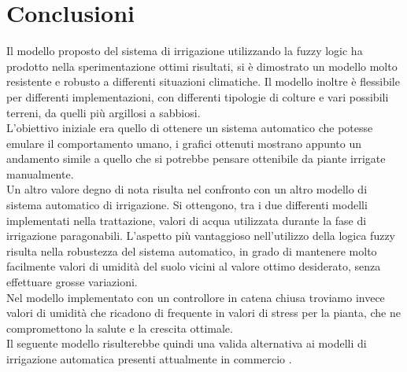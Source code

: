 \documentclass[conference,10pt]{IEEEtran}
\begin{document}
\section{Conclusioni}\label{sec:conclusion}
Il modello proposto del sistema di irrigazione utilizzando la fuzzy logic ha prodotto nella sperimentazione ottimi risultati, si è dimostrato un modello molto resistente e robusto a differenti situazioni climatiche. Il modello inoltre è flessibile per differenti implementazioni, con differenti tipologie di colture e vari possibili terreni, da quelli più argillosi a sabbiosi.\\
L'obiettivo iniziale era quello di ottenere un sistema automatico che potesse emulare il comportamento umano, i grafici ottenuti mostrano appunto un andamento simile a quello che si potrebbe pensare ottenibile da piante irrigate manualmente.\\
 Un altro valore degno di nota risulta nel confronto con un altro modello di sistema automatico di irrigazione. Si ottengono, tra i due differenti modelli implementati nella trattazione, valori di acqua utilizzata durante la fase di irrigazione paragonabili. L'aspetto più vantaggioso nell'utilizzo della logica fuzzy risulta nella robustezza del sistema automatico, in grado di mantenere molto facilmente valori di umidità del suolo vicini al valore ottimo desiderato, senza effettuare grosse variazioni.\\
 Nel modello implementato con un controllore in catena chiusa troviamo invece valori di umidità che ricadono di frequente in valori di stress per la pianta, che ne compromettono la salute e la crescita ottimale.\\
Il seguente modello risulterebbe quindi una valida alternativa ai modelli di irrigazione automatica presenti attualmente in commercio .




%

\end{document}
